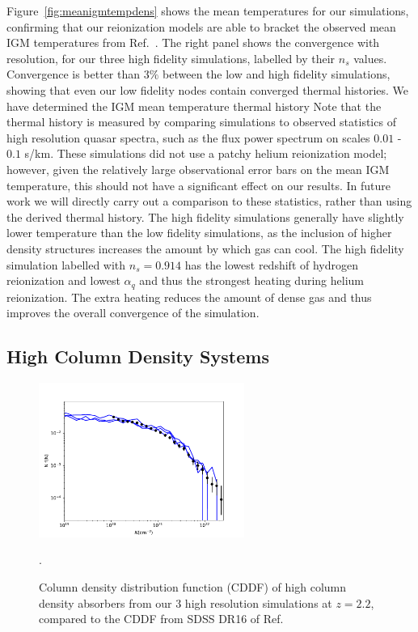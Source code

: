 \documentclass[a4paper,11pt]{article}
\begin{document}
Figure~\ref{fig:meanigmtempdens} shows the mean temperatures for our simulations, confirming that our reionization models are able to bracket the observed mean IGM temperatures from Ref.~\cite{Gaikwad:2021}. The right panel shows the convergence with resolution, for our three high fidelity simulations, labelled by their $n_s$ values. Convergence is better than $3\%$ between the low and high fidelity simulations, showing that even our low fidelity nodes contain converged thermal histories. We have determined the IGM mean temperature thermal history Note that the thermal history is measured by comparing simulations to observed statistics of high resolution quasar spectra, such as the flux power spectrum on scales $0.01$ - $0.1$ s/km. These simulations did not use a patchy helium reionization model; however, given the relatively large observational error bars on the mean IGM temperature, this should not have a significant effect on our results. In future work we will directly carry out a comparison to these statistics, rather than using the derived thermal history. The high fidelity simulations generally have slightly lower temperature than the low fidelity simulations, as the inclusion of higher density structures increases the amount by which gas can cool. The high fidelity simulation labelled with $n_s=0.914$ has the lowest redshift of hydrogen reionization and lowest $\alpha_q$ and thus the strongest heating during helium reionization. The extra heating reduces the amount of dense gas and thus improves the overall convergence of the simulation.


\subsection{High Column Density Systems}

\begin{figure}
\centering
\includegraphics[width=0.6\textwidth]{figures/cddf_hires.pdf}
 \caption{Column density distribution function (CDDF) of high column density absorbers from our $3$ high resolution simulations at $z=2.2$, compared to the CDDF from SDSS DR16 of Ref.~\cite{2021MNRAS.507..704H}}.
 \label{fig:DLACDDF}
\end{figure}
\end{document}
